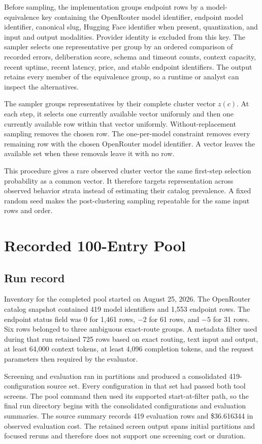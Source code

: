 \documentclass[11pt]{article}
\begin{document}
Before sampling, the implementation groups endpoint rows by a model-equivalence key containing the OpenRouter model identifier, endpoint model identifier, canonical slug, Hugging Face identifier when present, quantization, and input and output modalities.  Provider identity is excluded from this key.  The sampler selects one representative per group by an ordered comparison of recorded errors, deliberation score, schema and timeout counts, context capacity, recent uptime, recent latency, price, and stable endpoint identifiers.  The output retains every member of the equivalence group, so a runtime or analyst can inspect the alternatives.

The sampler groups representatives by their complete cluster vector $z(c)$.  At each step, it selects one currently available vector uniformly and then one currently available row within that vector uniformly.  Without-replacement sampling removes the chosen row.  The one-per-model constraint removes every remaining row with the chosen OpenRouter model identifier.  A vector leaves the available set when these removals leave it with no row.

This procedure gives a rare observed cluster vector the same first-step selection probability as a common vector.  It therefore targets representation across observed behavior strata instead of estimating their catalog prevalence.  A fixed random seed makes the post-clustering sampling repeatable for the same input rows and order.

\section{Recorded 100-Entry Pool}

\subsection{Run record}

Inventory for the completed pool started on August 25, 2026.  The OpenRouter catalog snapshot contained 419 model identifiers and 1,553 endpoint rows.  The endpoint status field was 0 for 1,461 rows, $-2$ for 61 rows, and $-5$ for 31 rows.  Six rows belonged to three ambiguous exact-route groups.  A metadata filter used during that run retained 725 rows based on exact routing, text input and output, at least 64,000 context tokens, at least 4,096 completion tokens, and the request parameters then required by the evaluator.

Screening and evaluation ran in partitions and produced a consolidated 419-configuration source set.  Every configuration in that set had passed both tool screens.  The pool command then used its supported start-at-filter path, so the final run directory begins with the consolidated configurations and evaluation summaries.  The source summary records 419 evaluation rows and \$36.616344 in observed evaluation cost.  The retained screen output spans initial partitions and focused reruns and therefore does not support one screening cost or duration.
\end{document}

